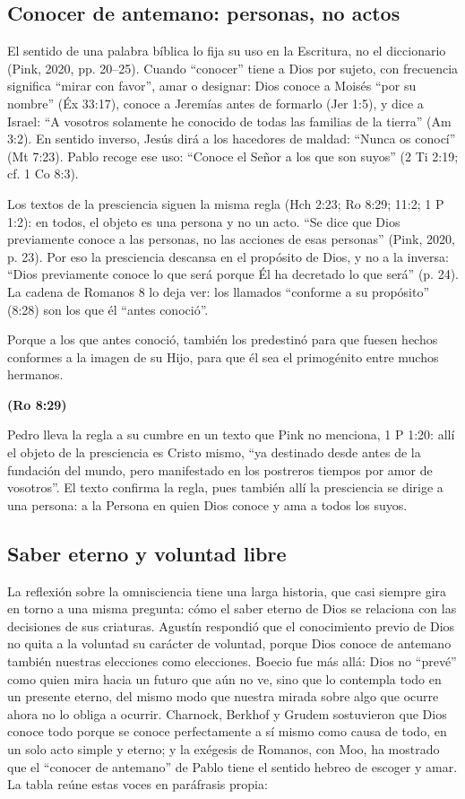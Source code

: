 \documentclass[11pt,letterpaper]{article}
\newcommand{\fuente}[1]{\par\hfill{\upshape\bfseries\small\textcolor{azul}{#1}}}
\begin{document}
\subsection{Conocer de antemano: personas, no actos}
El sentido de una palabra bíblica lo fija su uso en la Escritura, no el diccionario (Pink, 2020, pp. 20--25). Cuando ``conocer'' tiene a Dios por sujeto, con frecuencia significa ``mirar con favor'', amar o designar: Dios conoce a Moisés ``por su nombre'' (Éx 33:17), conoce a Jeremías antes de formarlo (Jer 1:5), y dice a Israel: ``A vosotros solamente he conocido de todas las familias de la tierra'' (Am 3:2). En sentido inverso, Jesús dirá a los hacedores de maldad: ``Nunca os conocí'' (Mt 7:23). Pablo recoge ese uso: ``Conoce el Señor a los que son suyos'' (2 Ti 2:19; cf. 1 Co 8:3).

Los textos de la presciencia siguen la misma regla (Hch 2:23; Ro 8:29; 11:2; 1 P 1:2): en todos, el objeto es una persona y no un acto. ``Se dice que Dios previamente conoce a las personas, no las acciones de esas personas'' (Pink, 2020, p. 23). Por eso la presciencia descansa en el propósito de Dios, y no a la inversa: ``Dios previamente conoce lo que será porque Él ha decretado lo que será'' (p. 24). La cadena de Romanos 8 lo deja ver: los llamados ``conforme a su propósito'' (8:28) son los que él ``antes conoció''.

\begin{cita}Porque a los que antes conoció, también los predestinó para que fuesen hechos conformes a la imagen de su Hijo, para que él sea el primogénito entre muchos hermanos.\fuente{(Ro 8:29)}\end{cita}

Pedro lleva la regla a su cumbre en un texto que Pink no menciona, 1 P 1:20: allí el objeto de la presciencia es Cristo mismo, ``ya destinado desde antes de la fundación del mundo, pero manifestado en los postreros tiempos por amor de vosotros''. El texto confirma la regla, pues también allí la presciencia se dirige a una persona: a la Persona en quien Dios conoce y ama a todos los suyos.

\subsection{Saber eterno y voluntad libre}
La reflexión sobre la omnisciencia tiene una larga historia, que casi siempre gira en torno a una misma pregunta: cómo el saber eterno de Dios se relaciona con las decisiones de sus criaturas. Agustín respondió que el conocimiento previo de Dios no quita a la voluntad su carácter de voluntad, porque Dios conoce de antemano también nuestras elecciones como elecciones. Boecio fue más allá: Dios no ``prevé'' como quien mira hacia un futuro que aún no ve, sino que lo contempla todo en un presente eterno, del mismo modo que nuestra mirada sobre algo que ocurre ahora no lo obliga a ocurrir. Charnock, Berkhof y Grudem sostuvieron que Dios conoce todo porque se conoce perfectamente a sí mismo como causa de todo, en un solo acto simple y eterno; y la exégesis de Romanos, con Moo, ha mostrado que el ``conocer de antemano'' de Pablo tiene el sentido hebreo de escoger y amar. La tabla reúne estas voces en paráfrasis propia:
\end{document}
